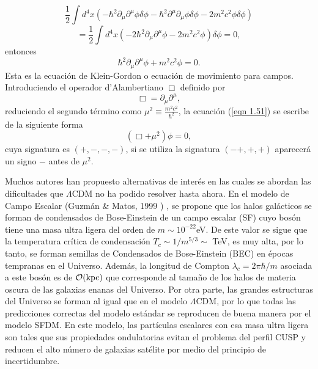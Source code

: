 \documentclass[a4paper,openright,10pt, oneside, final]{book}
\begin{document}
\begin{equation*}
\frac{1}{2} \int d^{4}x (-\hbar^{2}\partial_{\mu}\partial^{\mu}\phi\delta\phi
- \hbar^{2}\partial^{\mu}\partial_{\mu}\phi\delta\phi
- 2m^{2}c^{2}\phi\delta\phi)
\end{equation*}
\begin{equation}
= \frac{1}{2} \int d^{4}x (-2\hbar^{2}\partial_{\mu}\partial^{\mu}\phi
- 2m^{2}c^{2}\phi)\delta\phi = 0,\label{eqn 1.50}
\end{equation}
entonces
\begin{equation}
\hbar^{2}\partial_{\mu}\partial^{\mu}\phi + m^{2}c^{2}\phi = 0.\label{eqn 1.51}
\end{equation}
Esta es la ecuación de Klein-Gordon o ecuación de movimiento para campos. Introduciendo el operador d'Alambertiano $\Box$ definido por
\begin{equation}
\Box = \partial_{\mu}\partial^{\mu},\label{eqn 1.52}
\end{equation}
reduciendo el segundo término como $\mu^{2}\equiv\frac{m^{2}c^{2}}{\hbar^{2}}$, la ecuación (\ref{eqn 1.51}) se escribe de la siguiente forma
\begin{equation}
\left(\Box + \mu^{2}\right)\phi = 0,\label{eqn 1.53}
\end{equation}
cuya signatura es $(+,-,-,-)$, si se utiliza la signatura $(- +,+,+)$ aparecerá un signo $-$ antes de $\mu^{2}$.

Muchos autores han propuesto alternativas de interés en las cuales se abordan las dificultades que $\Lambda$CDM no ha podido resolver hasta ahora. En el modelo de Campo Escalar (Guzmán \& Matos, 1999 \cite{Siddhartha Matos}) , se propone que los halos galácticos se forman de condensados de Bose-Einstein de un campo escalar (SF) cuyo bosón tiene una masa ultra ligera del orden de $m \sim 10^{-22}$eV. De este valor se sigue que la temperatura crítica de condensación $T_{c} \sim 1/m^{5/3} \sim $ TeV, es muy alta, por lo tanto, se forman semillas de Condensados de Bose-Einstein (BEC) en épocas tempranas en el Universo. Además, la longitud de Compton $\lambda_{c} = 2\pi \hbar / m$ asociada a este bosón es de $\mathcal{O}(\textup{kpc})$ que corresponde al tamaño de los halos de materia oscura de las galaxias enanas del Universo. Por otra parte, las grandes estructuras del Universo se forman al igual que en el modelo $\Lambda$CDM, por lo que todas las predicciones correctas del modelo estándar se reproducen de buena manera por el modelo SFDM. En este modelo, las partículas escalares con esa masa ultra ligera son tales que sus propiedades ondulatorias evitan el problema del perfil CUSP y reducen el alto número de galaxias satélite por medio del principio de incertidumbre.
\end{document}
